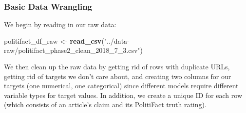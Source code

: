 \documentclass[12pt]{article}
\newenvironment{Shaded}{\begin{snugshade}}{\end{snugshade}}
\newcommand{\KeywordTok}[1]{\textcolor[rgb]{0.13,0.29,0.53}{\textbf{#1}}}
\newcommand{\NormalTok}[1]{#1}
\newcommand{\StringTok}[1]{\textcolor[rgb]{0.31,0.60,0.02}{#1}}
\begin{document}
\label{sec:appendix-data}

\hypertarget{basic-data-wrangling}{%
\subsubsection{Basic Data Wrangling}\label{basic-data-wrangling}}

We begin by reading in our raw data:

\begin{Shaded}
\begin{Highlighting}[]
\NormalTok{politifact_df_raw <-}\StringTok{ }\KeywordTok{read_csv}\NormalTok{(}\StringTok{"../data-raw/politifact_phase2_clean_2018_7_3.csv"}\NormalTok{) }
\end{Highlighting}
\end{Shaded}

We then clean up the raw data by getting rid of rows with duplicate
URLs, getting rid of targets we don't care about, and creating two
columns for our targets (one numerical, one categorical) since different
models require different variable types for target values. In addition,
we create a unique ID for each row (which consists of an article's claim
and its PolitiFact truth rating).
\end{document}

